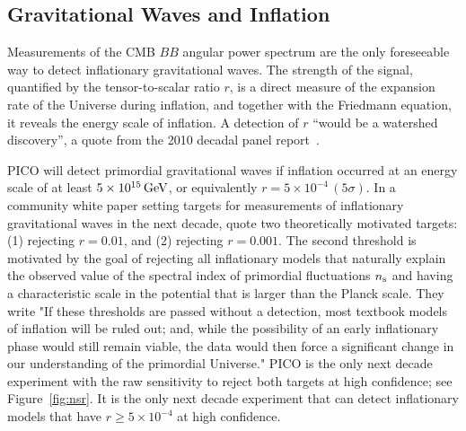 \documentclass[PICOAPC.tex]{subfiles}
\begin{document}
\subsection{Gravitational Waves and Inflation}
\label{sec:inflation}

Measurements of the \ac{CMB} $BB$ angular power spectrum are the only foreseeable way to detect  inflationary gravitational waves. The strength of the signal, quantified by the tensor-to-scalar ratio $r$, is a direct measure of the expansion rate of the Universe during inflation, and together with the Friedmann equation, it reveals the energy scale of inflation. A detection of $r$  ``would be a watershed discovery'', a quote from the 2010 decadal panel report~\citep{blandford2010}. 

PICO will detect primordial gravitational waves if inflation occurred at an energy scale of at least $5\times 10^{15}\,\rm{GeV}$, or equivalently $r= 5\times 10^{-4} \, (5\sigma)$.  In a community white paper setting targets for measurements of inflationary gravitational waves in the next decade, \citet{Shandera_etal} quote two theoretically motivated targets: (1) rejecting $r=0.01$, and (2) rejecting $r=0.001$. The second threshold is motivated by the goal of rejecting all inflationary models that naturally explain the observed value of the spectral index of primordial fluctuations $n_{\rm s}$ and having a characteristic scale in the potential that is larger than the Planck scale. 
They write "If these thresholds are passed without a detection, most textbook models of inflation will be ruled out; and, while the possibility of an early inflationary phase would still remain viable, the data would then force a significant change in our understanding of the primordial Universe." PICO is the only next decade experiment with the raw sensitivity to reject both targets at high confidence; see Figure~\ref{fig:nsr}. It is the only next decade experiment that can detect inflationary models that have $r \geq 5\times 10^{-4}$ at high confidence. 
\end{document}
